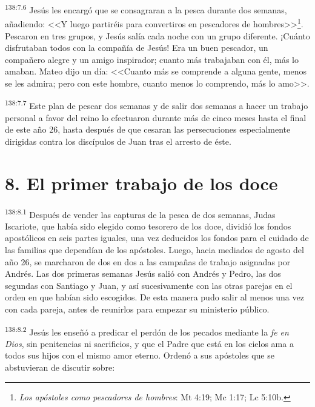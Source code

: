 \par 
\textsuperscript{138:7.6} Jesús les encargó que se consagraran a la pesca durante dos semanas, añadiendo: <<Y luego partiréis para convertiros en pescadores de hombres>>\footnote{\textit{Los apóstoles como pescadores de hombres}: Mt 4:19; Mc 1:17; Lc 5:10b.}. Pescaron en tres grupos, y Jesús salía cada noche con un grupo diferente. ¡Cuánto disfrutaban todos con la compañía de Jesús! Era un buen pescador, un compañero alegre y un amigo inspirador; cuanto más trabajaban con él, más lo amaban. Mateo dijo un día: <<Cuanto más se comprende a alguna gente, menos se les admira; pero con este hombre, cuanto menos lo comprendo, más lo amo>>.

\par 
\textsuperscript{138:7.7} Este plan de pescar dos semanas y de salir dos semanas a hacer un trabajo personal a favor del reino lo efectuaron durante más de cinco meses hasta el final de este año 26, hasta después de que cesaran las persecuciones especialmente dirigidas contra los discípulos de Juan tras el arresto de éste.

\section*{8. El primer trabajo de los doce}
\par 
\textsuperscript{138:8.1} Después de vender las capturas de la pesca de dos semanas, Judas Iscariote, que había sido elegido como tesorero de los doce, dividió los fondos apostólicos en seis partes iguales, una vez deducidos los fondos para el cuidado de las familias que dependían de los apóstoles. Luego, hacia mediados de agosto del año 26, se marcharon de dos en dos a las campañas de trabajo asignadas por Andrés. Las dos primeras semanas Jesús salió con Andrés y Pedro, las dos segundas con Santiago y Juan, y así sucesivamente con las otras parejas en el orden en que habían sido escogidos. De esta manera pudo salir al menos una vez con cada pareja, antes de reunirlos para empezar su ministerio público.

\par 
\textsuperscript{138:8.2} Jesús les enseñó a predicar el perdón de los pecados mediante la \textit{fe en Dios}, sin penitencias ni sacrificios, y que el Padre que está en los cielos ama a todos sus hijos con el mismo amor eterno. Ordenó a sus apóstoles que se abstuvieran de discutir sobre:

